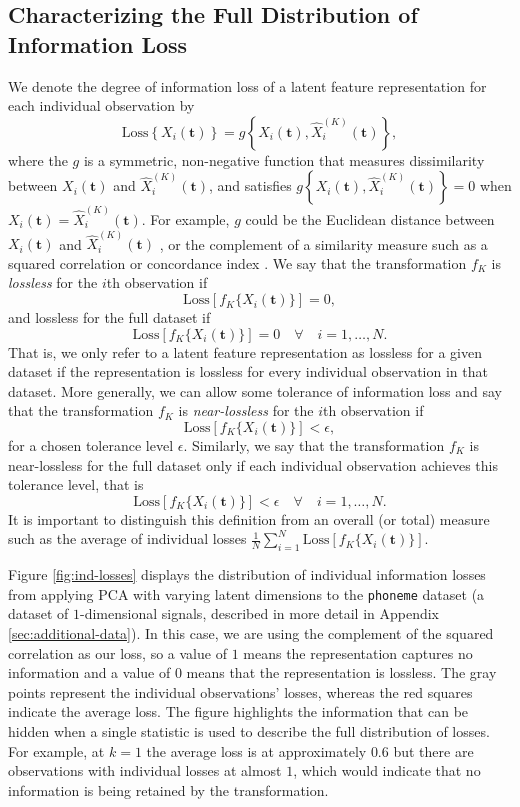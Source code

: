 \subsection{Characterizing the Full Distribution of Information Loss}\label{sec:characterising-information-loss}

We denote the degree of information loss of a latent feature representation for each individual observation by 
$$
\text{Loss} \left\{ X_i(\mathbf{t}) \right\} 
= g\left\{ X_i(\mathbf{t}), \widehat{X}_i^{(K)}(\mathbf{t}) \right\},
$$
where the $g$ is a symmetric, non-negative function that measures dissimilarity between $X_i(\mathbf{t})$ and $\widehat{X}_i^{(K)}(\mathbf{t})$, and satisfies $g\left\{ X_i(\mathbf{t}), \widehat{X}_i^{(K)}(\mathbf{t}) \right\}=0$ when $X_i(\mathbf{t})=\widehat{X}_i^{(K)}(\mathbf{t})$.
For example, $g$ could be the Euclidean distance between $X_i(\mathbf{t})$ and $\widehat{X}_i^{(K)}(\mathbf{t})$ \parencite{morris_comparison_2017}, or the complement of a similarity measure such as a squared correlation or concordance index \parencite{yang_quantile_2020}.
We say that the transformation $f_K$ is \emph{lossless} for the $i$th observation if
$$
\text{Loss} \left[ f_K\{X_i(\mathbf{t})\} \right] = 0,
$$
and lossless for the full dataset if
$$
\text{Loss} \left[ f_K\{X_i(\mathbf{t})\} \right] = 0 \quad \forall \quad  i = 1, \dots, N.
$$
That is, we only refer to a latent feature representation as lossless for a given dataset if the representation is lossless for every individual observation in that dataset.
More generally, we can allow some tolerance of information loss and say that
the transformation $f_K$ is \emph{near-lossless} for the $i$th observation if
$$
\text{Loss} \left[ f_K\{X_i(\mathbf{t})\} \right] < \epsilon,
$$
for a chosen tolerance level $\epsilon$. 
Similarly, we say that the transformation $f_K$ is near-lossless for the full dataset only if each individual observation achieves this tolerance level, that is
$$
\text{Loss} \left[ f_K\{X_i(\mathbf{t})\} \right] < \epsilon \quad \forall \quad  i = 1, \dots, N.
$$
It is important to distinguish this definition from an overall (or total) measure such as the average of individual losses $\frac{1}{N}\sum_{i=1}^N \text{Loss} \left[ f_K\{X_i(\mathbf{t})\} \right]$.

Figure \ref{fig:ind-losses} displays the distribution of individual information losses from applying PCA with varying latent dimensions to the \texttt{phoneme} dataset (a dataset of $1$-dimensional signals, described in more detail in Appendix \ref{sec:additional-data}).
In this case, we are using the complement of the squared correlation as our loss, so a value of $1$ means the representation captures no information and a value of $0$ means that the representation is lossless.
The gray points represent the individual observations' losses, whereas the red squares indicate the average loss.
The figure highlights the information that can be hidden when a single statistic is used to describe the full distribution of losses. For example, at $k = 1$ the average loss is at approximately $0.6$ but there are observations with individual losses at almost $1$, which would indicate that no information is being retained by the transformation.



